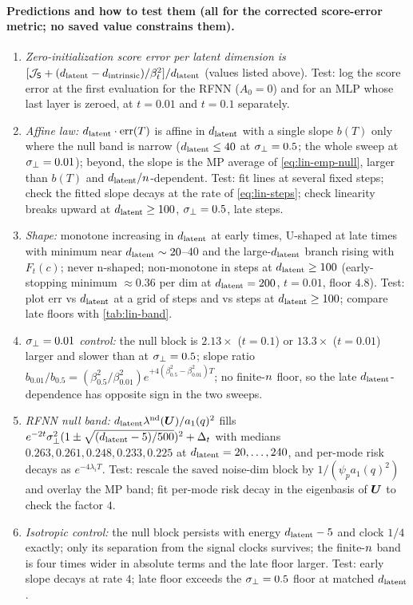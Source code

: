 \paragraph{Predictions and how to test them (all for the corrected score-error metric; no saved value constrains them).}
\begin{enumerate}
\item \emph{Zero-initialization score error per latent dimension is $[\mathcal J_{\mathsf S}+(d_{\mathrm{latent}}-d_{\mathrm{intrinsic}})/\beta_t^2]/d_{\mathrm{latent}}$} (values listed above). Test: log the score error at the first evaluation for the RFNN ($A_0=0$) and for an MLP whose last layer is zeroed, at $t=0.01$ and $t=0.1$ separately.
\item \emph{Affine law:} $d_{\mathrm{latent}}\cdot\mathrm{err}(T)$ is affine in $d_{\mathrm{latent}}$ with a single slope $b(T)$ only where the null band is narrow ($d_{\mathrm{latent}}\le40$ at $\sigma_{\perp}=0.5$; the whole sweep at $\sigma_{\perp}=0.01$); beyond, the slope is the MP average of \eqref{eq:lin-emp-null}, larger than $b(T)$ and $d_{\mathrm{latent}}/n$-dependent. Test: fit lines at several fixed steps; check the fitted slope decays at the rate of \eqref{eq:lin-steps}; check linearity breaks upward at $d_{\mathrm{latent}}\ge100$, $\sigma_{\perp}=0.5$, late steps.
\item \emph{Shape:} monotone increasing in $d_{\mathrm{latent}}$ at early times, U-shaped at late times with minimum near $d_{\mathrm{latent}}\sim20$--$40$ and the large-$d_{\mathrm{latent}}$ branch rising with $F_t(c)$; never n-shaped; non-monotone in steps at $d_{\mathrm{latent}}\ge100$ (early-stopping minimum $\approx0.36$ per dim at $d_{\mathrm{latent}}=200$, $t=0.01$, floor $4.8$). Test: plot $\mathrm{err}$ vs $d_{\mathrm{latent}}$ at a grid of steps and vs steps at $d_{\mathrm{latent}}\ge100$; compare late floors with \cref{tab:lin-band}.
\item \emph{$\sigma_{\perp}=0.01$ control:} the null block is $2.13\times$ ($t=0.1$) or $13.3\times$ ($t=0.01$) larger and slower than at $\sigma_{\perp}=0.5$; slope ratio $b_{0.01}/b_{0.5}=(\beta^2_{0.5}/\beta^2_{0.01})e^{+4(\beta^2_{0.5}-\beta^2_{0.01})T}$; no finite-$n$ floor, so the late $d_{\mathrm{latent}}$-dependence has opposite sign in the two sweeps.
\item \emph{RFNN null band:} $d_{\mathrm{latent}}\lambda^{\rm nd}(\bm{U})/a_1(q)^2$ fills $e^{-2t}\sigma_{\perp}^2(1\pm\sqrt{(d_{\mathrm{latent}}-5)/500})^2+\Delta_t$ with medians $0.263,0.261,0.248,0.233,0.225$ at $d_{\mathrm{latent}}=20,\dots,240$, and per-mode risk decays as $e^{-4\lambda_iT}$. Test: rescale the saved noise-dim block by $1/(\psi_pa_1(q)^2)$ and overlay the MP band; fit per-mode risk decay in the eigenbasis of $\bm{U}$ to check the factor $4$.
\item \emph{Isotropic control:} the null block persists with energy $d_{\mathrm{latent}}-5$ and clock $1/4$ exactly; only its separation from the signal clocks survives; the finite-$n$ band is four times wider in absolute terms and the late floor larger. Test: early slope decays at rate $4$; late floor exceeds the $\sigma_{\perp}=0.5$ floor at matched $d_{\mathrm{latent}}$.
\end{enumerate}

